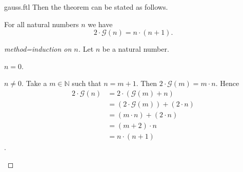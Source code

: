 \documentclass[english]{article}
\newcommand{\gauss}{\mathcal{G}}
\begin{document}
\begin{smodule}{gauss.ftl}
\noindent Then the theorem can be stated as follows.

\begin{forthel}
  \begin{theorem*}[title=Little Gauß,id=little_gauss]
    For all natural numbers $n$ we have
    \[2 \cdot \gauss(n) = n \cdot (n + 1).\]
  \end{theorem*}
  \begin{proof}[method=induction on $n$]
    Let $n$ be a natural number.

    \begin{case}{$n = 0$.} \end{case}

    \begin{case}{$n \neq 0$.}
      Take a $m \in \mathbb{N}$ such that $n = m + 1$.
      Then $2 \cdot \gauss(m) = m \cdot n$.
      Hence
      \begin{align*}
            2 \cdot \gauss(n)
        & = 2 \cdot (\gauss(m) + n)           \\
        & = (2 \cdot \gauss(m)) + (2 \cdot n) \\
        & = (m \cdot n) + (2 \cdot n)         \\
        & = (m + 2) \cdot n                   \\
        & = n \cdot (n + 1)
      \end{align*}.
    \end{case}
  \end{proof}
\end{forthel}

\end{smodule}
\end{document}
